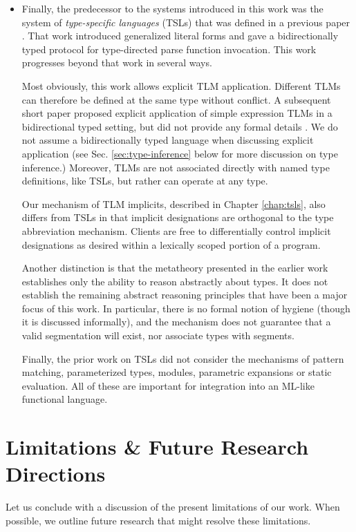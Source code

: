 \begin{itemize}
\item Finally, the predecessor to the systems introduced in this work was the system of \emph{type-specific languages} (TSLs) that was defined in a previous paper \cite{TSLs}. That work introduced generalized literal forms and gave a bidirectionally typed protocol for type-directed parse function invocation. This work progresses beyond that work in several ways.

Most obviously, this work allows explicit TLM application. Different TLMs can therefore be defined at the same type without conflict. A subsequent short paper proposed explicit application of simple expression TLMs in a bidirectional typed setting, but did not provide any formal details \cite{sac15}. We do not assume a bidirectionally typed language when discussing explicit application (see Sec. \ref{sec:type-inference} below for more discussion on type inference.) 
Moreover, TLMs are not associated directly with named type definitions, like TSLs,  but rather can operate at any type.  

Our mechanism of TLM implicits, described in Chapter \ref{chap:tsls}, also differs from TSLs in that implicit designations are orthogonal to the type abbreviation mechanism. Clients are free to differentially control implicit designations as desired within a lexically scoped portion of a program.

Another distinction is that the metatheory presented in the earlier work establishes only the ability to reason abstractly about types. It does not establish the remaining abstract reasoning principles that have been a major focus of this work. In particular, there is no formal notion of hygiene (though it is discussed informally), and the mechanism does not guarantee that a valid segmentation will exist, nor associate types with segments.

Finally, the prior work on TSLs did not consider the mechanisms of pattern matching, parameterized types, modules, parametric expansions or static evaluation. All of these are important for integration into an ML-like functional language.

\end{itemize}

\vspace{-8px}
\section{Limitations \& Future Research Directions}\label{sec:future-work}
Let us conclude with a discussion of the present limitations of our work. When possible, we outline future research that might resolve these limitations.

